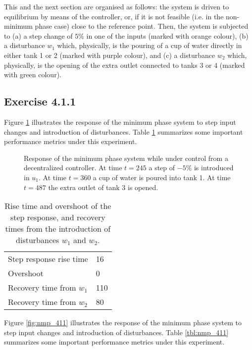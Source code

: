 This and the next section are organised as follows: the system is driven to
equilibrium by means of the controller, or, if it is not feasible (i.e. in the
non-minimum phase case) close to the reference point. Then, the system is
subjected to (a) a step change of $5\%$ in one of the inputs (marked with orange
colour), (b) a disturbance $w_1$ which, physically, is the pouring of a cup of
water directly in either tank 1 or 2 (marked with purple colour), and (c) a
disturbance $w_2$ which, physically, is the opening of the extra outlet
connected to tanks 3 or 4 (marked with green colour).


\subsection*{Exercise 4.1.1}

Figure \ref{fig:mp_411} illustrates the response of the minimum phase system
to step input changes and introduction of disturbances. Table \ref{tbl:mp_411}
summarizes some important performance metrics under this experiment.

\begin{figure}[H]\centering
  
  \caption{Response of the minimum phase system while under control from a
    decentralized controller. At time $t = 245$ a step of $-5\%$ is introduced
    in $u_1$. At time $t = 360$ a cup of water is poured into tank 1. At time
    $t = 487$ the extra outlet of tank 3 is opened.}
  \label{fig:mp_411}
\end{figure}

\begin{table}[H]\centering
    \begin{tabular}{l|l}
    Step response rise time     & 16  \\
    Overshoot                   & 0   \\
    Recovery time from $w_1$    & 110 \\
    Recovery time from $w_2$    & 80  \\
    \end{tabular}
    \caption{Rise time and overshoot of the step response, and recovery times
      from the introduction of disturbances $w_1$ and $w_2$.}
    \label{tbl:mp_411}
\end{table}


Figure \ref{fig:nmp_411} illustrates the response of the minimum phase system
to step input changes and introduction of disturbances. Table \ref{tbl:nmp_411}
summarizes some important performance metrics under this experiment.

